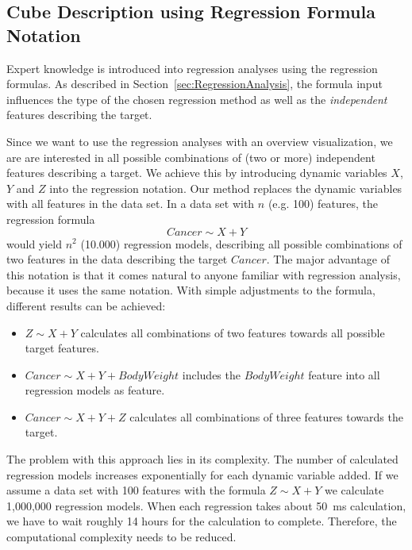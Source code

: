 \documentclass[journal]{style/vgtc} 			          %
\newcommand{\com}[1]{\textcolor{orange}{\uline{#1}}}
\begin{document}
\subsection{Cube Description using Regression Formula Notation}
Expert knowledge is introduced into regression analyses using the regression formulas.
As described in Section~\ref{sec:RegressionAnalysis}, the formula input influences the type of the chosen regression method as well as the \emph{independent} features describing the target.

Since we want to use the regression analyses with an overview visualization, we are are interested in all possible combinations of (two or more) independent features describing a target.
We achieve this by introducing dynamic variables $X$, $Y$ and $Z$ into the regression notation.
Our method replaces the dynamic variables with all features in the data set.
In a data set with $n$ (e.g. 100) features, the regression formula
\begin{equation}
Cancer \sim X + Y
\end{equation}
would yield $n^2$ (10.000) regression models, describing all possible combinations of two features in the data describing the target $Cancer$.
The major advantage of this notation is that it comes natural to anyone familiar with regression analysis, because it uses the same notation. 
With simple adjustments to the formula, different results can be achieved:
\begin{itemize}
	\item $Z \sim X + Y$ calculates all combinations of two features towards all possible target features.
	\item $Cancer \sim X + Y + BodyWeight$ includes the $BodyWeight$ feature into all regression models as feature.
	\item $Cancer \sim X + Y + Z$ calculates all combinations of three features towards the target.
\end{itemize}
The problem with this approach lies in its complexity.
The number of calculated regression models increases exponentially for each dynamic variable added.
If we assume a data set with 100 features with the formula $Z \sim X + Y$ we calculate 1,000,000 regression models.
When each regression takes about 50~ms calculation, we have to wait roughly 14 hours for the calculation to complete.
Therefore, the computational complexity needs to be reduced.
\end{document}

